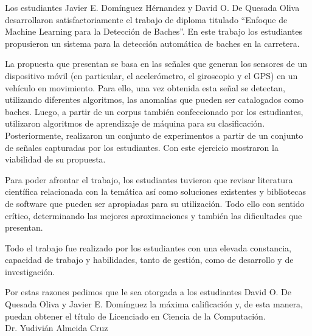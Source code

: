 \begin{opinion}
    Los estudiantes Javier E. Domínguez Hérnandez y David O. De Quesada Oliva desarrollaron satisfactoriamente el trabajo de diploma titulado 
    “Enfoque de Machine Learning para la Detección de Baches”. En este trabajo los estudiantes propusieron un sistema para 
    la detección automática de baches en la carretera.

    La propuesta que presentan se basa en las señales que generan los sensores de un dispositivo móvil (en particular, el acelerómetro, 
    el giroscopio y el GPS) en un vehículo en movimiento. Para ello, una vez obtenida esta señal se detectan, utilizando diferentes algoritmos, 
    las anomalías que pueden ser catalogados como baches. Luego, a partir de un corpus también confeccionado por los estudiantes, 
    utilizaron algoritmos de aprendizaje de máquina para su clasificación. Posteriormente, realizaron un conjunto de experimentos a 
    partir de un conjunto de señales capturadas por los estudiantes. Con este ejercicio mostraron la viabilidad de su propuesta.

    Para poder afrontar el trabajo, los estudiantes tuvieron que revisar literatura científica relacionada con la temática así como soluciones 
    existentes y bibliotecas de software que pueden ser apropiadas para su utilización. Todo ello con sentido crítico, determinando 
    las mejores aproximaciones y también las dificultades que presentan.

    Todo el trabajo fue realizado por los estudiantes con una elevada constancia, capacidad de trabajo y habilidades, tanto de gestión, como 
    de desarrollo y de investigación. 

    Por estas razones pedimos que le sea otorgada a los estudiantes David O. De Quesada Oliva y Javier E. Domínguez la máxima calificación y, 
    de esta manera,  puedan obtener el título de Licenciado en Ciencia de la Computación.\\

    \hfill  Dr. Yudivián Almeida Cruz
\end{opinion}
